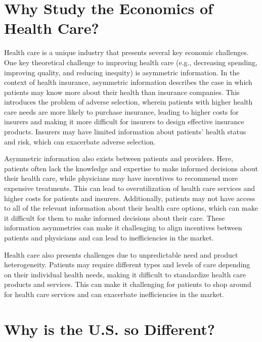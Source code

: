 \documentclass[
  letterpaper,
  DIV=11,
  numbers=noendperiod]{scrreport}
\theoremstyle{definition}
\theoremstyle{remark}
\begin{document}
\hypertarget{why-study-the-economics-of-health-care}{%
\section*{Why Study the Economics of Health
Care?}\label{why-study-the-economics-of-health-care}}


Health care is a unique industry that presents several key economic
challenges. One key theoretical challenge to improving health care
(e.g., decreasing spending, improving quality, and reducing inequity) is
asymmetric information. In the context of health insurance, asymmetric
information describes the case in which patients may know more about
their health than insurance companies. This introduces the problem of
adverse selection, wherein patients with higher health care needs are
more likely to purchase insurance, leading to higher costs for insurers
and making it more difficult for insurers to design effective insurance
products. Insurers may have limited information about patients' health
status and risk, which can exacerbate adverse selection.

Asymmetric information also exists between patients and providers. Here,
patients often lack the knowledge and expertise to make informed
decisions about their health care, while physicians may have incentives
to recommend more expensive treatments. This can lead to overutilization
of health care services and higher costs for patients and insurers.
Additionally, patients may not have access to all of the relevant
information about their health care options, which can make it difficult
for them to make informed decisions about their care. These information
asymmetries can make it challenging to align incentives between patients
and physicians and can lead to inefficiencies in the market.

Health care also presents challenges due to unpredictable need and
product heterogeneity. Patients may require different types and levels
of care depending on their individual health needs, making it difficult
to standardize health care products and services. This can make it
challenging for patients to shop around for health care services and can
exacerbate inefficiencies in the market.

\hypertarget{why-is-the-u.s.-so-different}{%
\section*{Why is the U.S. so
Different?}\label{why-is-the-u.s.-so-different}}
\end{document}
